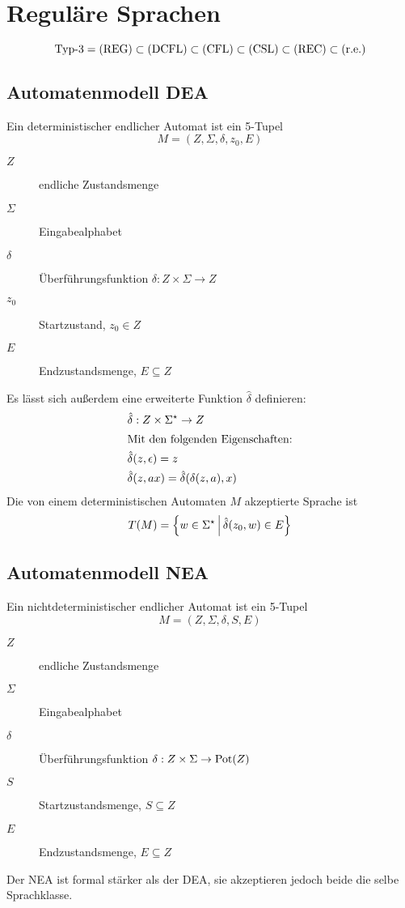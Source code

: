 \chapter{Reguläre Sprachen}\label{sec:typ3}
\begin{equation*}
	\text{Typ-3} = \mathrm{(REG)}\subset\mathrm{(DCFL)}\subset\mathrm{(CFL)}\subset\mathrm{(CSL)}\subset\mathrm{(REC)}\subset\mathrm{(r.e.)}
\end{equation*}

\section{Automatenmodell DEA}
Ein deterministischer endlicher Automat ist ein 5-Tupel
\begin{equation*}
	M=(Z,\Sigma,\delta,z_0,E)
\end{equation*}
\begin{description}
	\item[$Z$] endliche Zustandsmenge
	\item[$\Sigma$] Eingabealphabet
	\item[$\delta$] Überführungsfunktion $\delta:Z\times\Sigma\rightarrow Z$
	\item[$z_0$] Startzustand, $z_0\in Z$
	\item[$E$] Endzustandsmenge, $E\subseteq Z$
\end{description}
\bigskip
Es lässt sich außerdem eine erweiterte Funktion $\hat\delta$ definieren:
\begin{align*}
	&\hat\delta:Z\times\Sigma^\star\rightarrow Z\\
	\intertext{Mit den folgenden Eigenschaften:}
	&\hat\delta(z,\epsilon)=z\\
	&\hat\delta(z,ax)=\hat\delta(\delta(z,a),x)
\end{align*}
Die von einem deterministischen Automaten $M$ akzeptierte Sprache ist
\begin{equation*}
	T(M)=\left\{ w\in\Sigma^\star \,\middle|\, \hat\delta(z_0,w)\in E \right\}
\end{equation*}

\section{Automatenmodell NEA}\label{reg:nea}
Ein nichtdeterministischer endlicher Automat ist ein 5-Tupel
\begin{equation*}
	M=(Z,\Sigma,\delta,S,E)
\end{equation*}
\begin{description}
	\item[$Z$] endliche Zustandsmenge
	\item[$\Sigma$] Eingabealphabet
	\item[$\delta$] Überführungsfunktion $\delta:Z\times\Sigma\rightarrow \mathrm{Pot}(Z)$
	\item[$S$] Startzustandsmenge, $S\subseteq Z$
	\item[$E$] Endzustandsmenge, $E\subseteq Z$
\end{description}
Der NEA ist formal stärker als der DEA, sie akzeptieren jedoch beide die selbe Sprachklasse.

